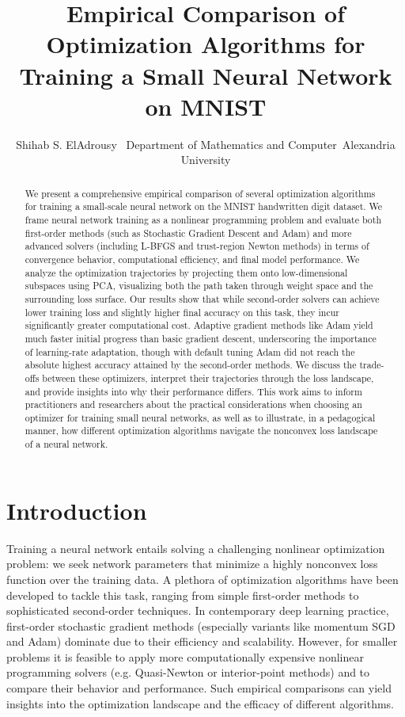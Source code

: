 \documentclass[12pt]{article}
\begin{document}
\title{Empirical Comparison of Optimization Algorithms for Training a Small Neural Network on MNIST}
\author{Shihab S. ElAdrousy \ 
Department of Mathematics and Computer\ 
Alexandria University}
\date{}
\maketitle

\begin{abstract}
We present a comprehensive empirical comparison of several optimization algorithms for training a small-scale neural network on the MNIST handwritten digit dataset. We frame neural network training as a nonlinear programming problem and evaluate both first-order methods (such as Stochastic Gradient Descent and Adam) and more advanced solvers (including L-BFGS and trust-region Newton methods) in terms of convergence behavior, computational efficiency, and final model performance. We analyze the optimization trajectories by projecting them onto low-dimensional subspaces using PCA, visualizing both the path taken through weight space and the surrounding loss surface. Our results show that while second-order solvers can achieve lower training loss and slightly higher final accuracy on this task, they incur significantly greater computational cost. Adaptive gradient methods like Adam yield much faster initial progress than basic gradient descent, underscoring the importance of learning-rate adaptation, though with default tuning Adam did not reach the absolute highest accuracy attained by the second-order methods. We discuss the trade-offs between these optimizers, interpret their trajectories through the loss landscape, and provide insights into why their performance differs. This work aims to inform practitioners and researchers about the practical considerations when choosing an optimizer for training small neural networks, as well as to illustrate, in a pedagogical manner, how different optimization algorithms navigate the nonconvex loss landscape of a neural network.
\end{abstract}


\section{Introduction}
Training a neural network entails solving a challenging nonlinear optimization problem: we seek network parameters that minimize a highly nonconvex loss function over the training data. A plethora of optimization algorithms have been developed to tackle this task, ranging from simple first-order methods to sophisticated second-order techniques. In contemporary deep learning practice, first-order stochastic gradient methods (especially variants like momentum SGD and Adam) dominate due to their efficiency and scalability. However, for smaller problems it is feasible to apply more computationally expensive nonlinear programming solvers (e.g. Quasi-Newton or interior-point methods) and to compare their behavior and performance. Such empirical comparisons can yield insights into the optimization landscape and the efficacy of different algorithms.
\end{document}
